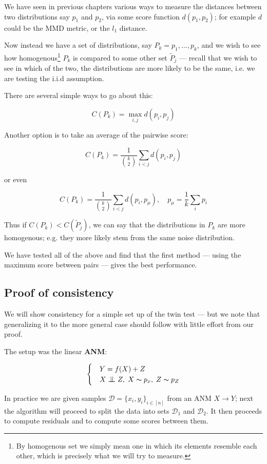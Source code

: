 We have seen in previous chapters various ways to measure the distances between two distributions say 
$p_1$ and $p_2$, via some score function $d(p_1, p_2)$; for example $d$ could be the 
MMD metric, or the $l_1$ distance.

Now instead we have a set of distributions, say $P_k = p_1, ..., p_k$, and we wish to see how homogenous\footnote{
    By homogenous set we simply mean one in which its elements resemble each other, which is precisely what we will try to measure. 
}
$P_k$ is compared to some other set $\tilde{P}_j$ ---  recall that we wish to see in which of the two, 
 the distributions are more likely to be the same, i.e. we are testing the i.i.d assumption. 

There are several simple ways to go about this:

$$
    C(P_k) = \operatorname{max}_{i, j} d(p_i, p_j)
$$

Another option is to take an average of the pairwise score:

$$
    C(P_k) = \frac{1}{\binom{k}{2}} \sum_{i < j} d(p_i, p_j)
$$

or even 

$$
    C(P_k) = \frac{1}{\binom{k}{2}} \sum_{i < j} d(p_i, p_\mu)
    , \quad p_\mu = \frac{1}{k} \sum_i p_i
$$


Thus if $C(P_k) < C(\tilde{P}_j)$, we can say that the distributions in $P_k$ are
more homogenous; e.g. they more likely stem from the same noise distribution. 

We have tested all of the above and find that the first method ---  using the maximum score between pairs ---
gives the best performance.




\subsection{Proof of consistency}

We will show consistency for a simple set up of the twin test ---  but we note that generalizing it to the more 
general case should follow with little effort from our proof. 


The setup was the linear \textbf{ANM}:

\[ \begin{cases} 
    & Y = f(X) + Z  \\
    & X \bigCI Z,\; X \thicksim p_x,\; Z \thicksim p_{Z}  
 \end{cases}
\]

In practice we are given samples $\mathcal{D} = \{x_i, y_i\}_{i \in [n]}$ from an ANM $X \rightarrow Y$; next 
the algorithm will proceed to split the data into sets $\mathcal{D}_1$ and $\mathcal{D}_2$. It then proceeds 
to compute residuals and to compute some scores between them.

